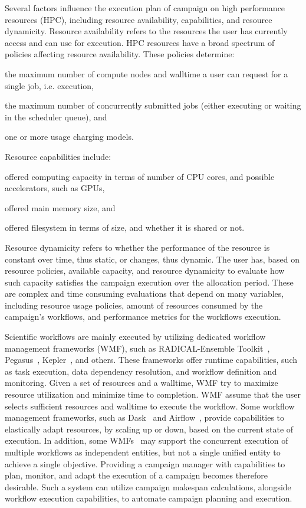 Several factors influence the execution plan of campaign on high performance resources (HPC), including resource availability, capabilities, and resource dynamicity.
Resource availability refers to the resources the user has currently access and can use for execution. 
HPC resources have a broad spectrum of policies affecting resource availability. 
These policies determine:
\begin{inparaenum}[1)]
\item the maximum number of compute nodes and walltime a user can request for a single job, i.e. execution,
\item the maximum number of concurrently submitted jobs (either executing or waiting in the scheduler queue), and
\item one or more usage charging models.
\end{inparaenum}
Resource capabilities include: 
\begin{inparaenum}[1)]
\item offered computing capacity in terms of number of CPU cores, and possible accelerators, such as GPUs,
\item offered main memory size, and
\item offered filesystem in terms of size, and whether it is shared or not.
\end{inparaenum} 
Resource dynamicity refers to whether the performance of the resource is constant over time, thus static, or changes, thus dynamic.
The user has, based on resource policies, available capacity, and resource dynamicity to evaluate how such capacity satisfies the campaign execution over the allocation period.
These are complex and time consuming evaluations that depend on many variables, including resource usage policies, amount of resources consumed by the campaign’s workflows, and performance metrics for the workflows execution.

Scientific workflows are mainly executed by utilizing dedicated workflow management frameworks (WMF), such as RADICAL-Ensemble Toolkit~\cite{balasubramanian2018harnessing}, Pegasus~\cite{deelman2015pegasus}, Kepler~\cite{ludascher2006concurrency}, and others.
These frameworks offer runtime capabilities, such as task execution, data dependency resolution, and workflow definition and monitoring.
Given a set of resources and a walltime, WMF try to maximize resource utilization and minimize time to completion.
WMF assume that the user selects sufficient resources and walltime to execute the workflow.
Some workflow management frameworks, such as Dask~\cite{rocklin2015dask} and Airflow~\cite{airflow}, provide capabilities to elastically adapt resources, by scaling up or down, based on the current state of execution.
In addition, some  WMFs~\cite{deelman2015pegasus} may support the concurrent execution of multiple workflows as independent entities, but not a single unified entity to achieve a single objective.
Providing a campaign manager with capabilities to plan, monitor, and adapt the execution of a campaign becomes therefore desirable.
Such a system can utilize campaign makespan calculations, alongside workflow execution capabilities, to automate campaign planning and execution. 

